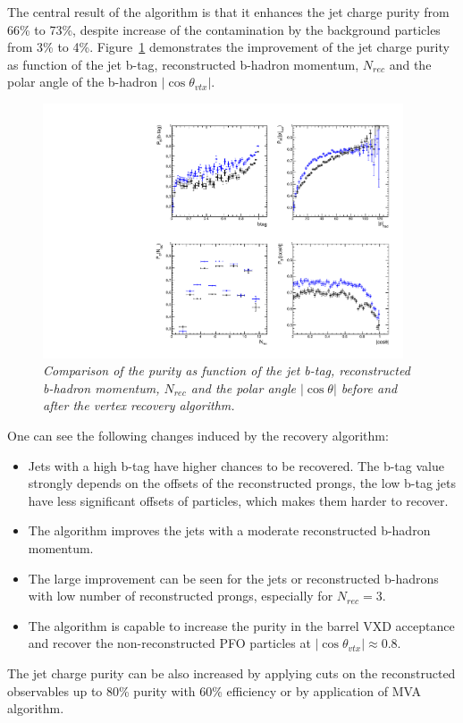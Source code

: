 The central result of the algorithm is that it enhances the jet charge purity from 66\% to 73\%, despite increase of the contamination by the  background particles from 3\% to 4\%.
Figure~\ref{fig:RecoveryPurityComparison_3} demonstrates the improvement of the jet charge purity as function of the jet b-tag, reconstructed b-hadron momentum, $N_{rec}$ and the polar angle of the b-hadron  $|\cos\theta_{vtx}|$.
\begin{figure}
{\centering
    \includegraphics[width=0.95\textwidth]{ILD/plots/recovery-purity-comparison.pdf}
    \caption{\sl Comparison of the purity as function of the jet b-tag, reconstructed b-hadron momentum, $N_{rec}$ and the polar angle $|\cos\theta|$ before and after the vertex recovery algorithm.  
    }
    \label{fig:RecoveryPurityComparison_3}
  }
\end{figure}
One can see the following changes induced by the recovery algorithm:
\begin{itemize}
\item Jets with a high b-tag have higher chances to be recovered. The b-tag value strongly depends on the offsets of the reconstructed prongs, the low b-tag jets have less significant offsets of particles, which makes them  harder to recover. 
\item The algorithm improves the jets with a moderate reconstructed b-hadron momentum. %
\item The large improvement can be seen for the jets or reconstructed b-hadrons with low number of reconstructed prongs, especially for $N_{rec}=3$.%
\item The algorithm is capable to increase the purity in the barrel VXD acceptance and recover the non-reconstructed PFO particles at $|\cos\theta_{vtx}| \approx 0.8$. 
\end{itemize}
The jet charge purity can be also increased by applying cuts on the reconstructed observables up to 80\% purity with 60\% efficiency or by application of MVA algorithm.

